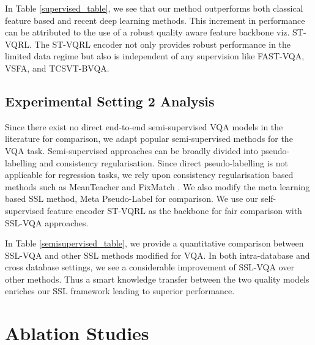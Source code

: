 \documentclass[10pt,twocolumn,letterpaper]{article}
\begin{document}
In Table \ref{supervised_table}, we see that our method outperforms both classical feature based and recent deep learning methods. This increment in performance can be attributed to the use of a robust quality aware feature backbone viz. ST-VQRL. The ST-VQRL encoder not only provides robust performance in the limited data regime but also is independent of any supervision like FAST-VQA, VSFA, and TCSVT-BVQA.

\subsection{Experimental Setting 2 Analysis} \label{sec:ssl_benchmark}

Since there exist no direct end-to-end semi-supervised VQA models in the literature for comparison, we adapt popular semi-supervised methods for the VQA task. Semi-supervised approaches can be broadly divided into pseudo-labelling and consistency regularisation. Since direct pseudo-labelling is not applicable for regression tasks, we rely upon consistency regularisation based methods such as MeanTeacher \cite{mean_teach} and FixMatch \cite{fixmatch}. We also modify the meta learning based SSL method, Meta Pseudo-Label \cite{mpl} for comparison. We use our self-supervised feature encoder ST-VQRL as the backbone for fair comparison with SSL-VQA approaches. 

In Table \ref{semisupervised_table}, we provide a quantitative comparison between SSL-VQA and other SSL methods modified for VQA. In both intra-database and cross database settings, we see a considerable improvement of SSL-VQA over other methods. Thus a smart knowledge transfer between the two quality models enriches our SSL framework leading to superior performance. 

\section{Ablation Studies}
\end{document}
